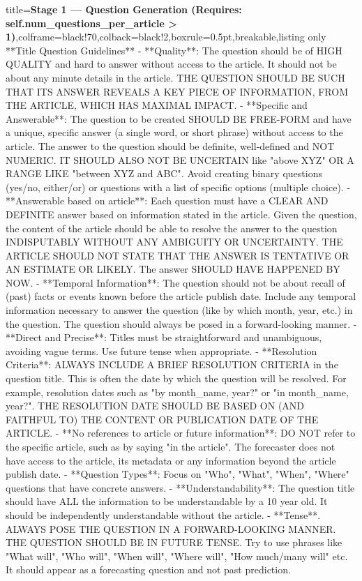 \documentclass{article} %
\begin{document}
\begin{tcblisting}{title={\textbf{Stage 1 --- Question Generation (Requires:  self.num\_questions\_per\_article > 1)}},colframe=black!70,colback=black!2,boxrule=0.5pt,breakable,listing only}
**Title Question Guidelines**
- **Quality**: The question should be of HIGH QUALITY and hard to answer without access to the article. It should not be about any minute details in the article. THE QUESTION SHOULD BE SUCH THAT ITS ANSWER REVEALS A KEY PIECE OF INFORMATION, FROM THE ARTICLE, WHICH HAS MAXIMAL IMPACT.
- **Specific and Answerable**: The question to be created SHOULD BE FREE-FORM and have a unique, specific answer (a single word, or short phrase) without access to the article. The answer to the question should be definite, well-defined and NOT NUMERIC. IT SHOULD ALSO NOT BE UNCERTAIN like "above XYZ" OR A RANGE LIKE "between XYZ and ABC". Avoid creating binary questions (yes/no, either/or) or questions with a list of specific options (multiple choice).
- **Answerable based on article**: Each question must have a CLEAR AND DEFINITE answer based on information stated in the article. Given the question, the content of the article should be able to resolve the answer to the question INDISPUTABLY WITHOUT ANY AMBIGUITY OR UNCERTAINTY. THE ARTICLE SHOULD NOT STATE THAT THE ANSWER IS TENTATIVE OR AN ESTIMATE OR LIKELY. The answer SHOULD HAVE HAPPENED BY NOW.
- **Temporal Information**: The question should not be about recall of (past) facts or events known before the article publish date. Include any temporal information necessary to answer the question (like by which month, year, etc.) in the question. The question should always be posed in a forward-looking manner. 
- **Direct and Precise**: Titles must be straightforward and unambiguous, avoiding vague terms. Use future tense when appropriate.
- **Resolution Criteria**: ALWAYS INCLUDE A BRIEF RESOLUTION CRITERIA in the question title. This is often the date by which the question will be resolved. For example, resolution dates such as "by {{month_name}}, {{year}}?" or "in {{month_name}}, {{year}}?". THE RESOLUTION DATE SHOULD BE BASED ON (AND FAITHFUL TO) THE CONTENT OR PUBLICATION DATE OF THE ARTICLE.
- **No references to article or future information**: DO NOT refer to the specific article, such as by saying "in the article". The forecaster does not have access to the article, its metadata or any information beyond the article publish date.
- **Question Types**: Focus on "Who", "What", "When", "Where" questions that have concrete answers.
- **Understandability**: The question title should have ALL the information to be understandable by a 10 year old. It should be independently understandable without the article.
- **Tense**. ALWAYS POSE THE QUESTION IN A FORWARD-LOOKING MANNER. THE QUESTION SHOULD BE IN FUTURE TENSE. Try to use phrases like "What will", "Who will", "When will", "Where will", "How much/many will" etc. It should appear as a forecasting question and not past prediction. 


\end{tcblisting}
\end{document}
